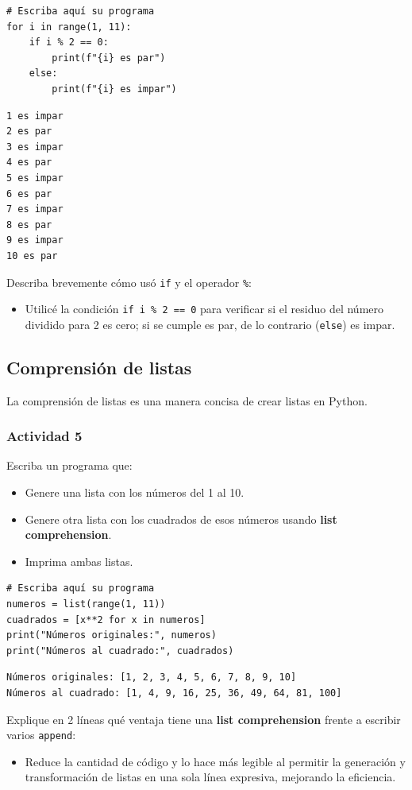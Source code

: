 \documentclass{article}
\begin{document}
\begin{verbatim}
# Escriba aquí su programa
for i in range(1, 11):
    if i % 2 == 0:
        print(f"{i} es par")
    else:
        print(f"{i} es impar")
\end{verbatim}

\begin{verbatim}
1 es impar
2 es par
3 es impar
4 es par
5 es impar
6 es par
7 es impar
8 es par
9 es impar
10 es par
\end{verbatim}

Describa brevemente cómo usó \texttt{if} y el operador \texttt{\%}:
\begin{itemize}
\item Utilicé la condición \texttt{if i \% 2 == 0} para verificar si el residuo del número dividido para 2 es cero; si se cumple es par, de lo contrario (\texttt{else}) es impar.
\end{itemize}

\subsection{Comprensión de listas}
\label{sec:org191bf0b}
La comprensión de listas es una manera concisa de crear listas en Python.

\subsubsection{Actividad 5}
\label{sec:orga8995f8}
Escriba un programa que:
\begin{itemize}
\item Genere una lista con los números del 1 al 10.
\item Genere otra lista con los cuadrados de esos números usando \textbf{list comprehension}.
\item Imprima ambas listas.
\end{itemize}

\begin{verbatim}
# Escriba aquí su programa
numeros = list(range(1, 11))
cuadrados = [x**2 for x in numeros]
print("Números originales:", numeros)
print("Números al cuadrado:", cuadrados)
\end{verbatim}

\begin{verbatim}
Números originales: [1, 2, 3, 4, 5, 6, 7, 8, 9, 10]
Números al cuadrado: [1, 4, 9, 16, 25, 36, 49, 64, 81, 100]
\end{verbatim}


Explique en 2 líneas qué ventaja tiene una \textbf{list comprehension} frente a escribir varios \texttt{append}:
\begin{itemize}
\item Reduce la cantidad de código y lo hace más legible al permitir la generación y transformación de listas en una sola línea expresiva, mejorando la eficiencia.
\end{itemize}
\end{document}
